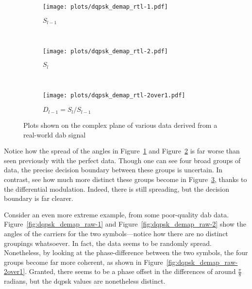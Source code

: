 \documentclass[class=report,11pt,crop=false]{standalone}
\begin{document}
\begin{figure}[htbp]
  \centering
  \captionsetup{type=figure}
  \begin{subfigure}[t]{0.3\textwidth}
    \centering
    \captionsetup{type=figure}
    \texttt{[image: plots/dqpsk\_demap\_rtl-1.pdf]}
    \caption{\(S_{l-1}\)}
    \label{fig:dqpsk_demap_rtl-1}
  \end{subfigure}%
  ~ 
  \begin{subfigure}[t]{0.3\textwidth}
    \centering
    \captionsetup{type=figure}
    \texttt{[image: plots/dqpsk\_demap\_rtl-2.pdf]}
    \caption{\(S_{l}\)}
    \label{fig:dqpsk_demap_rtl-2}
  \end{subfigure}
  ~ 
  \begin{subfigure}[t]{0.3\textwidth}
    \centering
    \captionsetup{type=figure}
    \texttt{[image: plots/dqpsk\_demap\_rtl-2over1.pdf]}
    \caption{\(D_{l-1} = S_{l}/S_{l-1}\)}
    \label{fig:dqpsk_demap_rtl-2over1}
  \end{subfigure}
  \caption{Plots shown on the complex plane of various data derived from a real-world \gls{dab} signal}
  \label{fig:dqpsk_demap_rtl}
\end{figure}

Notice how the spread of the angles in Figure~\ref{fig:dqpsk_demap_rtl-1} and Figure~\ref{fig:dqpsk_demap_rtl-2} is far worse than seen previously with the perfect data. Though one can see four broad groups of data, the precise decision boundary between these groups is uncertain. In contrast, see how much more distinct these groups become in Figure~\ref{fig:dqpsk_demap_rtl-2over1}, thanks to the differential modulation. Indeed, there is still spreading, but the decision boundary is far clearer.

Consider an even more extreme example, from some poor-quality \gls{dab} data. Figure~\ref{fig:dqpsk_demap_raw-1} and Figure~\ref{fig:dqpsk_demap_raw-2} show the angles of the carriers for the two symbols---notice how there are no distinct groupings whatsoever. In fact, the data seems to be randomly spread. Nonetheless, by looking at the phase-difference between the two symbols, the four groups become far more coherent, as shown in Figure~\ref{fig:dqpsk_demap_raw-2over1}. Granted, there seems to be a phase offset in the differences of around \(\frac{\pi}{8}\) radians, but the \gls{dqpsk} values are nonetheless distinct.
\end{document}

